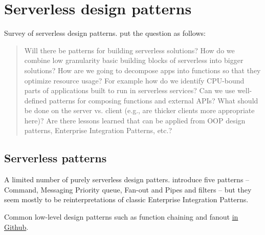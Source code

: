 \chapter{Serverless design patterns} \label{cha:patterns}


Survey of serverless design patterns. \textcite{baldini17currentTrends} put the question as follows:

\begin{quote}
Will there be patterns for building serverless solutions? How do we combine low granularity basic building blocks of serverless into bigger solutions? How are we going to decompose apps into functions so that they optimize resource usage? For example how do we identify CPU-bound parts of applications built to run in serverless services? Can we use well-defined patterns for composing functions and external APIs? What should be done on the server vs. client (e.g., are thicker clients more appropriate here)? Are there lessons learned that can be applied from OOP design patterns, Enterprise Integration Patterns, etc.?
\end{quote}

\section{Serverless patterns}


A limited number of purely serverless design patters. \textcite{sbarski2017serverless} introduce five patterns -- Command, Messaging Priority queue, Fan-out and Pipes and filters -- but they seem mostly to be reinterpretations of classic Enterprise Integration Patterns.

Common low-level design patterns such as function chaining and fanout \href{https://github.com/yochay/serverlesspatterns}{in Github}.

